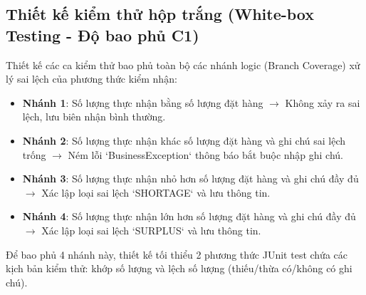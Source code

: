 \documentclass[12pt]{extreport}
\begin{document}
\subsection{Thiết kế kiểm thử hộp trắng (White-box Testing - Độ bao phủ C1)}
Thiết kế các ca kiểm thử bao phủ toàn bộ các nhánh logic (Branch Coverage) xử lý sai lệch của phương thức kiểm nhận:
\begin{itemize}
    \item \textbf{Nhánh 1}: Số lượng thực nhận bằng số lượng đặt hàng $\rightarrow$ Không xảy ra sai lệch, lưu biên nhận bình thường.
    \item \textbf{Nhánh 2}: Số lượng thực nhận khác số lượng đặt hàng và ghi chú sai lệch trống $\rightarrow$ Ném lỗi `BusinessException` thông báo bắt buộc nhập ghi chú.
    \item \textbf{Nhánh 3}: Số lượng thực nhận nhỏ hơn số lượng đặt hàng và ghi chú đầy đủ $\rightarrow$ Xác lập loại sai lệch `SHORTAGE` và lưu thông tin.
    \item \textbf{Nhánh 4}: Số lượng thực nhận lớn hơn số lượng đặt hàng và ghi chú đầy đủ $\rightarrow$ Xác lập loại sai lệch `SURPLUS` và lưu thông tin.
\end{itemize}
Để bao phủ 4 nhánh này, thiết kế tối thiểu 2 phương thức JUnit test chứa các kịch bản kiểm thử: khớp số lượng và lệch số lượng (thiếu/thừa có/không có ghi chú).
\end{document}
